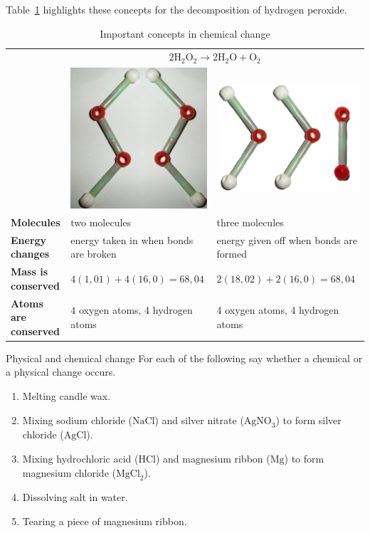 Table~\ref{tab:chemchangeconcepts} highlights these concepts for the decomposition of hydrogen peroxide.
\begin{table}[H]
 \begin{center}
  \begin{tabular}{|l|l|l|} \hline
& \multicolumn{2}{|c|}{$2\text{H}_{2}\text{O}_{2} \rightarrow 2\text{H}_{2}\text{O} + \text{O}_{2}$} \\ 
& \includegraphics[width=.1\textwidth]{photos/H2O2_models.png} & \includegraphics[width=.1\textwidth]{photos/H2O_O2.png} \\ \hline
   \textbf{Molecules} & two molecules & three molecules \\ \hline
\textbf{Energy changes} & energy taken in when bonds are broken & energy given off when bonds are formed \\ \hline
\textbf{Mass is conserved} & $4(1,01) + 4(16,0) = 68,04$ & $2(18,02) + 2(16,0) = 68,04$ \\ \hline
\textbf{Atoms are conserved} & 4 oxygen atoms, 4 hydrogen atoms & 4 oxygen atoms, 4 hydrogen atoms \\ \hline
  \end{tabular}
 \end{center}
\caption{Important concepts in chemical change}
\label{tab:chemchangeconcepts}
\end{table}
\begin{exercises}{Physical and chemical change}
 For each of the following say whether a chemical or a physical change occurs.
\begin{enumerate}[noitemsep, label=\textbf{\arabic*}. ]
\item Melting candle wax.
\item Mixing sodium chloride ($\text{NaCl}$) and silver nitrate ($\text{AgNO}_3$) to form silver chloride ($\text{AgCl}$).
\item Mixing hydrochloric acid ($\text{HCl}$) and magnesium ribbon ($\text{Mg}$) to form magnesium chloride ($\text{MgCl}_{2}$).
\item Dissolving salt in water.
\item Tearing a piece of magnesium ribbon. 
\end{enumerate}

\end{exercises}

